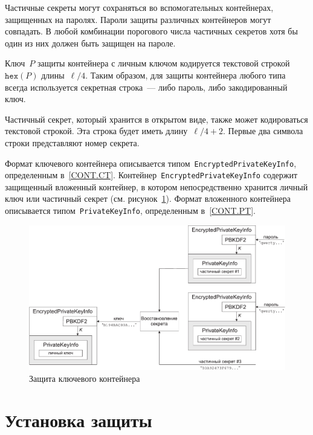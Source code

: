 Частичные секреты могут сохраняться во вспомогательных контейнерах, 
защищенных на паролях. Пароли защиты различных контейнеров могут совпадать.
В любой комбинации порогового числа частичных секретов хотя бы один из них 
должен быть защищен на пароле.

Ключ~$P$ защиты контейнера с личным ключом кодируется текстовой
строкой~$\texttt{hex}(P)$ длины~$\ell/4$.
%
Таким образом, для защиты контейнера любого типа всегда используется 
секретная строка~--- либо пароль, либо закодированный ключ.

Частичный секрет, который хранится в открытом виде, также может 
кодироваться текстовой строкой. Эта строка будет иметь длину~$\ell/4+2$.
Первые два символа строки представляют номер секрета.

Формат ключевого контейнера описывается 
типом~\texttt{EncryptedPrivateKeyInfo}, определенным в~\ref{CONT.CT}.
Контейнер~\texttt{EncryptedPrivateKeyInfo} содержит защищенный вложенный
контейнер, в котором непосредственно хранится личный ключ или частичный 
секрет (см. рисунок~\ref{Fig.CONT.1}). Формат вложенного контейнера 
описывается типом~\texttt{PrivateKeyInfo}, определенным в~\ref{CONT.PT}.

\begin{figure}[hbt]
\begin{center}
\includegraphics[width=15cm]{../figs/cont}
\end{center}
\caption{Защита ключевого контейнера}
\label{Fig.CONT.1}
\end{figure}

\section{Установка защиты}\label{CONT.Wrap}

